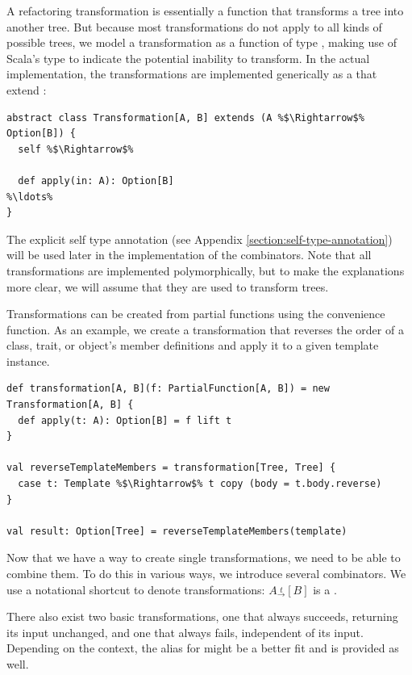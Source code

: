 A refactoring transformation is essentially a function that transforms a tree into another tree. But because most transformations do not apply to all kinds of possible trees, we model a transformation as a function of type , making use of Scala's  type to indicate the potential inability to transform. In the actual implementation, the transformations are implemented generically as a  that extend :

\begin{lstlisting}
abstract class Transformation[A, B] extends (A %$\Rightarrow$% Option[B]) {
  self %$\Rightarrow$%

  def apply(in: A): Option[B]
%\ldots%
}
\end{lstlisting}

The explicit self type annotation (see Appendix \vref{section:self-type-annotation}) will be used later in the implementation of the combinators. Note that all transformations are implemented polymorphically, but to make the explanations more clear, we will assume that they are used to transform trees.

Transformations can be created from partial functions using the  convenience function. As an example, we create a transformation that reverses the order of a class, trait, or object's member definitions and apply it to a given template instance.

\begin{lstlisting}
def transformation[A, B](f: PartialFunction[A, B]) = new Transformation[A, B] {
  def apply(t: A): Option[B] = f lift t
}

val reverseTemplateMembers = transformation[Tree, Tree] {
  case t: Template %$\Rightarrow$% t copy (body = t.body.reverse)
}

val result: Option[Tree] = reverseTemplateMembers(template)
\end{lstlisting}

Now that we have a way to create single transformations, we need to be able to combine them. To do this in various ways, we introduce several combinators. We use a notational shortcut to denote transformations: $A \overset{t}{_\rightarrow} [B]$ is a .

There also exist two basic transformations, one that always succeeds, returning its input unchanged, and one that always fails, independent of its input. Depending on the context, the alias  for  might be a better fit and is provided as well.

